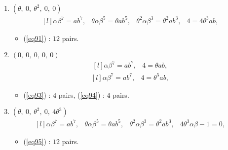\documentclass[12pt,a4wide, reqno]{amsart}
\theoremstyle{definition}
\theoremstyle{remark}
\numberwithin{equation}{section}
\begin{document}
\begin{enumerate}[label=\textbf{(\arabic*)}]
\begin{equation}
    \begin{matrix*}[l]
         \alpha \beta ^7=ab^7, & \theta^5\alpha\beta-1=\theta^5ab.
    \end{matrix*}
\end{equation}
\begin{equation}\label{eq90}
    \begin{matrix*}[l]
         \alpha \beta ^7=ab^7, & \theta^5\alpha\beta-1=0.
    \end{matrix*}
\end{equation}
\begin{itemize}
    \item 
    (\ref{eq88}) : $16$ pairs, (\ref{eq89}) : $12$ pairs, (\ref{eq90}) : $4$ pairs.
    \end{itemize}
\item 
$(\theta,~0,~\theta^2,~0,~0)$ 
\begin{equation}\label{eq91}
    \begin{matrix*}[l]
         \alpha \beta ^7=ab^7, & \theta\alpha\beta^5=\theta ab^5, & \theta^2\alpha\beta^3=\theta^2ab^3, & 4=4\theta^3ab,
    \end{matrix*}
\end{equation}
\begin{itemize}
    \item 
    (\ref{eq91}) : $12$ pairs.
    \end{itemize}
    \item 
    $(0,~0,~0,~0,~0)$ 
\begin{equation}\label{eq93}
    \begin{matrix*}[l]
         \alpha \beta ^7=ab^7,  & 4=\theta ab,
    \end{matrix*}
\end{equation}
\begin{equation}\label{eq94}
    \begin{matrix*}[l]
         \alpha \beta ^7=ab^7,  & 4=\theta^5ab,
    \end{matrix*}
\end{equation}
\begin{itemize}
    \item 
    (\ref{eq93}) : $4$ pairs, (\ref{eq94}) : $4$ pairs.
    \end{itemize}
\item 
$(\theta,~0,~\theta^2,~0,~4\theta^3)$ 
\begin{equation}\label{eq95}
    \begin{matrix*}[l]
         \alpha \beta ^7=ab^7, & \theta \alpha\beta^5=\theta ab^5, & \theta^2\alpha\beta^3=\theta^2ab^3, & 4\theta^3\alpha\beta-1=0,
    \end{matrix*}
\end{equation}
\begin{itemize}
    \item 
    (\ref{eq95}) : $12$ pairs.
    \end{itemize}
 \end{enumerate}
\end{document}
